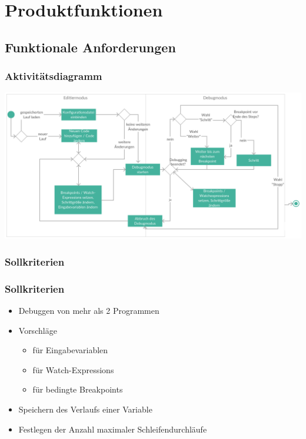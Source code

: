 \documentclass{beamer}
\begin{document}

\section{Produktfunktionen}

\subsection{Funktionale Anforderungen}
\begin{frame}
\frametitle{Aktivitätsdiagramm}
\includegraphics[scale=0.125]{../Aktivitaetsdiagramm}
\end{frame}
\subsubsection{Sollkriterien}
\begin{frame}
\frametitle{Sollkriterien}
\begin{itemize}
\item Debuggen von mehr als 2 Programmen
\item Vorschläge
\begin{itemize}
\item für Eingabevariablen
\item für Watch-Expressions
\item für bedingte Breakpoints
\end{itemize}
\item Speichern des Verlaufs einer Variable
\item Festlegen der Anzahl maximaler Schleifendurchläufe

\end{itemize}
\end{frame}

\end{document}
